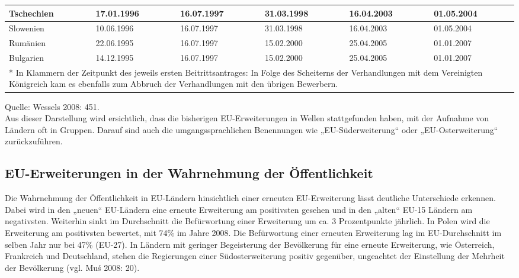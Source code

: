 \begin{table}[H]
\begin{tabular}{|p{2cm}|p{2cm}|p{2cm}|p{2cm}|p{2cm}|p{2cm}|}
Tschechien&
17.01.1996&
16.07.1997&
31.03.1998&
16.04.2003&
01.05.2004\\\hline
Slowenien&
10.06.1996&
16.07.1997&
31.03.1998&
16.04.2003&
01.05.2004\\\hline
Rumänien&
22.06.1995&
16.07.1997&
15.02.2000&
25.04.2005&
01.01.2007\\\hline
Bulgarien&
14.12.1995&
16.07.1997&
15.02.2000&
25.04.2005&
01.01.2007\\\hline
\multicolumn{6}{|p{12cm}|}{* In Klammern der Zeitpunkt des jeweils ersten Beitrittsantrages: In Folge des Scheiterns der Verhandlungen mit dem Vereinigten Königreich kam es ebenfalls zum Abbruch der Verhandlungen mit den übrigen Bewerbern.}\\\hline
\end{tabular}
\end{table}
Quelle: Wessels 2008: 451.\\
Aus dieser Darstellung wird ersichtlich, dass die bisherigen EU-Erweiterungen in Wellen stattgefunden haben, mit der Aufnahme von Ländern oft in Gruppen. Darauf sind auch die umgangssprachlichen Benennungen wie „EU-Süderweiterung“ oder „EU-Osterweiterung“ zurückzuführen. 

\subsection{EU-Erweiterungen in der Wahrnehmung der Öffentlichkeit}
Die Wahrnehmung der Öffentlichkeit in EU-Ländern hinsichtlich einer erneuten EU-Erweiterung lässt deutliche Unterschiede erkennen. Dabei wird in den „neuen“ EU-Ländern eine erneute Erweiterung am positivsten gesehen und in den „alten“ EU-15 Ländern am negativsten. Weiterhin sinkt im Durchschnitt die Befürwortung einer Erweiterung um ca. 3 Prozentpunkte jährlich. In Polen wird die Erweiterung am positivsten bewertet, mit 74\% im Jahre 2008. Die Befürwortung einer erneuten Erweiterung lag im EU-Durchschnitt im selben Jahr nur bei 47\% (EU-27). In Ländern mit geringer Begeisterung der Bevölkerung für eine erneute Erweiterung, wie Österreich, Frankreich und Deutschland, stehen die Regierungen einer Südosterweiterung positiv gegenüber, ungeachtet der Einstellung der Mehrheit der Bevölkerung (vgl. Muś 2008: 20).\par

